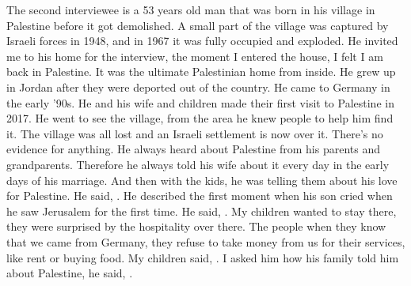 The second interviewee is a 53 years old man that was born in his village in Palestine before it got demolished. A small part of the village was captured by Israeli forces in 1948, and in 1967 it was fully occupied and exploded. He invited me to his home for the interview, the moment I entered the house, I felt I am back in Palestine. It was the ultimate Palestinian home from inside. He grew up in Jordan after they were deported out of the country. He came to Germany in the early '90s. He and his wife and children made their first visit to Palestine in 2017. He went to see the village, from the area he knew people to help him find it. The village was all lost and an Israeli settlement is now over it. There's no evidence for anything. He always heard about Palestine from his parents and grandparents. Therefore he always told his wife about it every day in the early days of his marriage. And then with the kids, he was telling them about his love for Palestine. He said, . He described the first moment when his son cried when he saw Jerusalem for the first time. He said, . My children wanted to stay there, they were surprised by the hospitality over there. The people when they know that we came from Germany, they refuse to take money from us for their services, like rent or buying food. My children said, . I asked him how his family told him about Palestine, he said, .


